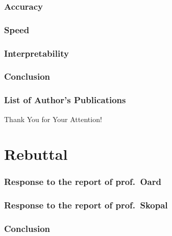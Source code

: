 \documentclass[aspectratio=169, t]{beamer}
\begin{document}
\section{Accuracy}
\section{Speed}
\section{Interpretability}
\section{Conclusion}
\section{List of Author's Publications}

\begin{frame}[plain]
\vfill
\centerline{Thank You for Your Attention!}
\vfill\vfill
\end{frame}

\part{Rebuttal}
\frame{\vfill\partpage\vfill}

\section{Response to the report of prof.\ Oard}
\section{Response to the report of prof.\ Skopal}
\section{Conclusion}

\part{\bibname}
\frame{\vfill\partpage\vfill}

\section{\bibname}
\begin{frame}[allowframebreaks]{\bibname}
\printbibliography[heading=none]
\end{frame}
\end{document}
